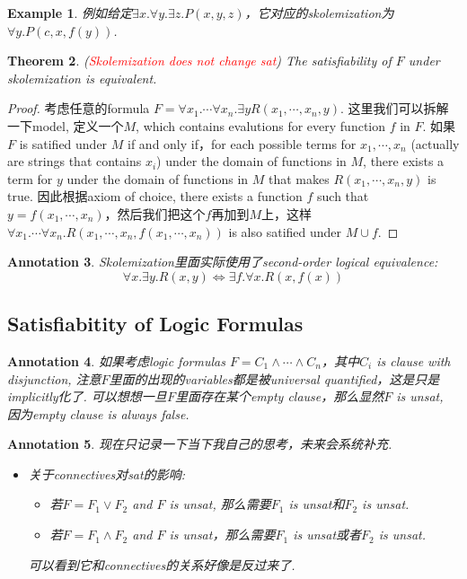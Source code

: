 \documentclass{article}
\theoremstyle{plain}
\newtheorem{theorem}{Theorem}
\newtheorem{example}[theorem]{Example}
\newtheorem{annotation}[theorem]{Annotation}
\theoremstyle{nonumberplain}
\newtheorem{proof}{Proof}
\newcommand{\redt}[1]{\textcolor{red}{#1}}
\begin{document}
\begin{example}
\rm 例如给定$\exists x. \forall y. \exists z. P(x,y,z)$，它对应的skolemization为$\forall y. P(c,x,f(y))$.
\end{example}

\begin{theorem}
\rm (\redt{Skolemization does not change sat}) The satisfiability of $F$ under skolemization is equivalent.   
\end{theorem}

\begin{proof}
\rm 考虑任意的formula $F = \forall x_1. \cdots \forall x_n. \exists y R(x_1, \cdots, x_n, y)$. 这里我们可以拆解一下model, 定义一个$M$, which contains evalutions for every function $f$ in $F$. 如果$F$ is satified under $M$ if and only if，for each possible terms for $x_1,\cdots, x_n$ (actually are strings that contains $x_i$) under the domain of functions in $M$, there exists a term for $y$ under the domain of functions in $M$ that makes $R(x_1,\cdots,x_n,y)$ is true. 因此根据axiom of choice, there exists a function $f$ such that $y = f(x_1,\cdots,x_n)$，然后我们把这个$f$再加到$M$上，这样$ \forall x_1. \cdots \forall x_n. R(x_1, \cdots, x_n, f(x_1,\cdots,x_n))$ is also satified under $M \cup f$. 
\end{proof}

\begin{annotation}
\rm Skolemization里面实际使用了second-order logical equivalence:
\[
	\forall x. \exists y. R(x,y) \iff \exists f. \forall x. R(x,f(x))
\]

\end{annotation}

\newpage
\subsection{Satisfiabitity of Logic Formulas}

\begin{annotation}
\rm 如果考虑logic formulas $F = C_1 \wedge \cdots \wedge C_n$，其中$C_i$ is clause with disjunction, 注意$F$里面的出现的variables都是被universal quantified，这是只是implicitly化了. 可以想想一旦$F$里面存在某个empty clause，那么显然$F$ is unsat, 因为empty clause is always false. 
\end{annotation}

\begin{annotation}
\rm 现在只记录一下当下我自己的思考，未来会系统补充. 
\begin{itemize}
	\item 关于connectives对sat的影响:
		\begin{itemize}
			\item 若$F = F_1 \vee F_2$ and $F$ is unsat, 那么需要$F_1$ is unsat和$F_2$ is unsat. 
			\item 若$F = F_1 \wedge F_2$ and $F$ is unsat，那么需要$F_1$ is unsat或者$F_2$ is unsat. 
		\end{itemize}
		可以看到它和connectives的关系好像是反过来了. 		 
\end{itemize}
\end{annotation}
\end{document}
